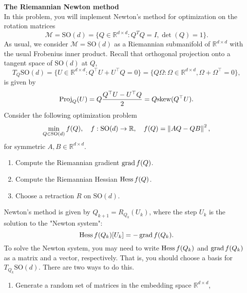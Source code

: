 \documentclass[en, oneside]{assignment}
\begin{document}
\begin{prob} \textbf{The Riemannian Newton method}\\
    In this problem, you will implement Newton's method for optimization on the rotation matrices
    \begin{equation*}
        \mathcal{M} = \text{SO}(d) = \{Q \in \mathbb{R}^{d \times d} : Q^TQ = I, \det(Q) = 1\}.
    \end{equation*}
    As usual, we consider $\mathcal{M} = \text{SO}(d)$ as a Riemannian submanifold of $\mathbb{R}^{d \times d}$ with the usual Frobenius inner product.
    Recall that orthogonal projection onto a tangent space of $\text{SO}(d)$ at $Q$, 
    \begin{equation*}
        T_Q\text{SO}(d) = \{U \in \mathbb{R}^{d \times d} : Q^\top U + U^\top Q = 0\} = \{Q\Omega: \Omega \in \mathbb{R}^{d \times d}, \Omega + \Omega^\top = 0\},
    \end{equation*}
    is given by
    \begin{equation*}
        \operatorname{Proj} _Q (U) = Q\frac{Q^\top U - U^\top Q}{2} = Q \text{skew}(Q^\top U).
    \end{equation*}
    Consider the following optimization problem
    \begin{equation*}
        \min_{Q \in \text{SO}(d)} f(Q), \quad f: \text{SO}(d) \to \mathbb{R}, \quad f(Q) = \left\lVert AQ - QB\right\rVert^2,
    \end{equation*}
    for symmetric $A, B \in \mathbb{R}^{d \times d}$.
    \begin{enumerate}[label=(\arabic*)]
        \item Compute the Riemannian gradient $\operatorname{grad} f(Q)$.
        \item Compute the Riemannian Hessian $\operatorname{Hess} f(Q)$.
        \item Choose a retraction $R$ on $\text{SO}(d)$.
    \end{enumerate}
    Newton's method is given by $Q_{k+1} = R_{Q_k}(U_k)$, where the step $U_k$ is the solution to the "Newton system":
    \begin{equation*}
        \operatorname{Hess} f(Q_k)[U_k] = -\operatorname{grad} f(Q_k).
    \end{equation*}
    To solve the Newton system, you may need to write $\operatorname{Hess} f(Q_k)$ and $\operatorname{grad} f(Q_k)$ as a matrix and a vector, respectively.
    That is, you should choose a basis for $T_{Q_k}\text{SO}(d)$. There are two ways to do this.
    \begin{enumerate}[label=(\arabic*), resume]
        \item Generate a random set of matrices in the embedding space $\mathbb{R}^{d \times d}$,

\end{enumerate}
\end{prob}
\end{document}
